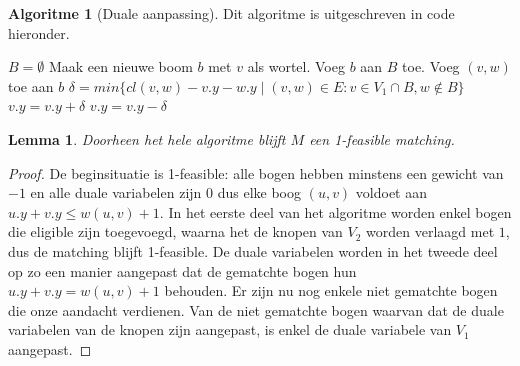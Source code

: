 \documentclass[conference]{IEEEtran}
\newtheorem{lemma}{Lemma}[section]
\theoremstyle{definition}
\newtheorem{algorithmm}{Algoritme}[section]
\begin{document}
\begin{algorithmm}[Duale aanpassing] \label{alg:match:match:2}
    Dit algoritme is uitgeschreven in code hieronder. %
\end{algorithmm}

\begin{algorithm}
    \caption{Duale aanpassing}
    \label{code:matching:matching:2}
    \begin{algorithmic}[0]
        \STATE $B = \emptyset$
            \STATE Maak een nieuwe boom $b$ met $v$ als wortel. Voeg $b$ aan $B$ toe.
                    \STATE Voeg $(v, w)$ toe aan $b$
                \ENDIF
            \ENDFOR
        \ENDFOR
        \STATE $\delta = min\{cl(v, w) - v.y - w.y \mid (v, w) \in E: v \in V_1 \cap B, w \notin B\}$
            \STATE $v.y = v.y + \delta$
        \ENDFOR
            \STATE $v.y = v.y - \delta$
        \ENDFOR
    \end{algorithmic}
\end{algorithm}

\begin{lemma}
    Doorheen het hele algoritme blijft $M$ een 1-feasible matching.
\end{lemma}
\begin{proof}
    De beginsituatie is 1-feasible: alle bogen hebben minstens een gewicht van $-1$ en alle duale variabelen zijn $0$ dus elke boog $(u, v)$ voldoet aan $u.y + v.y \leq w(u, v) + 1$. In het eerste deel van het algoritme worden enkel bogen die eligible zijn toegevoegd, waarna het de knopen van $V_2$ worden verlaagd met $1$, dus de matching blijft 1-feasible. De duale variabelen worden in het tweede deel op zo een manier aangepast dat de gematchte bogen hun $u.y + v.y = w(u, v) + 1$ behouden. Er zijn nu nog enkele niet gematchte bogen die onze aandacht verdienen. Van de niet gematchte bogen waarvan dat de duale variabelen van de knopen zijn aangepast, is enkel de duale variabele van $V_1$ aangepast. 
\end{proof}
\end{document}
